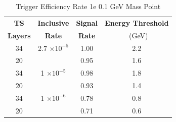 \begin{table}
 \centering
\caption{Trigger Efficiency Rate 1e 0.1 GeV Mass Point}
\begin{tabular}{ c | c | c | c }
\textbf{TS} & \textbf{Inclusive} & \textbf{Signal} & \textbf{Energy Threshold}  \\ \textbf{Layers} & \textbf{Rate} & \textbf{Rate} & \ (GeV) \\ 
\hline
34 & 2.7 $\times 10^{-5}$ & 1.00 & 2.2 \\ 
20 & & 0.95 & 1.6 \\ 
\hline 
34 & 1 $\times 10^{-5}$ & 0.98 & 1.8 \\ 
20 & & 0.93 & 1.4 \\ 
\hline 
34 & 1 $\times 10^{-6}$ & 0.78 & 0.8 \\ 
20 & & 0.71 & 0.6 \\ 
\hline 
\end{tabular}
\end{table}
